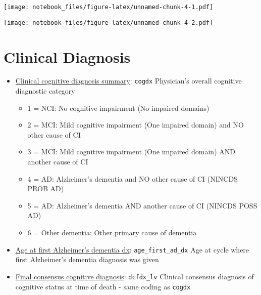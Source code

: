 \documentclass[]{book}
\newenvironment{Shaded}{\begin{snugshade}}{\end{snugshade}}
\newcommand{\DataTypeTok}[1]{\textcolor[rgb]{0.13,0.29,0.53}{#1}}
\newcommand{\DecValTok}[1]{\textcolor[rgb]{0.00,0.00,0.81}{#1}}
\newcommand{\KeywordTok}[1]{\textcolor[rgb]{0.13,0.29,0.53}{\textbf{#1}}}
\newcommand{\NormalTok}[1]{#1}
\newcommand{\OperatorTok}[1]{\textcolor[rgb]{0.81,0.36,0.00}{\textbf{#1}}}
\newcommand{\StringTok}[1]{\textcolor[rgb]{0.31,0.60,0.02}{#1}}
\providecommand{\tightlist}{%
  \setlength{\itemsep}{0pt}\setlength{\parskip}{0pt}}
\begin{document}
\texttt{[image: notebook\_files/figure-latex/unnamed-chunk-4-1.pdf]}

\begin{Shaded}
\end{Shaded}

\texttt{[image: notebook\_files/figure-latex/unnamed-chunk-4-2.pdf]}

\hypertarget{clinical-diagnosis}{%
\section{Clinical Diagnosis}\label{clinical-diagnosis}}

\begin{itemize}
\tightlist
\item
  \href{https://www.radc.rush.edu/docs/var/detail.htm?category=Clinical+Diagnosis\&subcategory=Final+consensus+diagnosis\&variable=cogdx}{Clinical cognitive diagnosis summary}: \texttt{cogdx} Physician's overall cognitive diagnostic category

  \begin{itemize}
  \tightlist
  \item
    1 = NCI: No cognitive impairment (No impaired domains)
  \item
    2 = MCI: Mild cognitive impairment (One impaired domain) and NO other cause of CI
  \item
    3 = MCI: Mild cognitive impairment (One impaired domain) AND another cause of CI
  \item
    4 = AD: Alzheimer's dementia and NO other cause of CI (NINCDS PROB AD)
  \item
    5 = AD: Alzheimer's dementia AND another cause of CI (NINCDS POSS AD)
  \item
    6 = Other dementia: Other primary cause of dementia
  \end{itemize}
\item
  \href{https://www.radc.rush.edu/docs/var/detail.htm?category=Clinical+Diagnosis\&subcategory=Dementia\&variable=age_first_ad_dx}{Age at first Alzheimer's dementia dx}: \texttt{age\_first\_ad\_dx} Age at cycle where first Alzheimer's dementia diagnosis was given
\item
  \href{https://www.radc.rush.edu/docs/var/detail.htm?category=Clinical+Diagnosis\&subcategory=Final+consensus+diagnosis\&variable=cogdx}{Final consensus cognitive diagnosis}: \texttt{dcfdx\_lv} Clinical consensus diagnosis of cognitive status at time of death - same coding as \texttt{cogdx}
\end{itemize}
\end{document}
